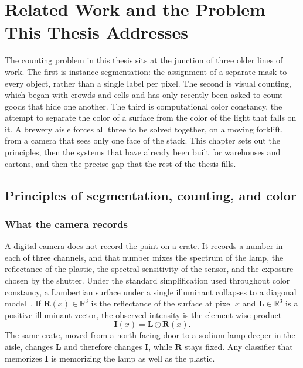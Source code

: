 \chapter{Related Work and the Problem This Thesis Addresses}
\label{ch:related}

The counting problem in this thesis sits at the junction of three older lines of work. The first is instance segmentation: the assignment of a separate mask to every object, rather than a single label per pixel. The second is visual counting, which began with crowds and cells and has only recently been asked to count goods that hide one another. The third is computational color constancy, the attempt to separate the color of a surface from the color of the light that falls on it. A brewery aisle forces all three to be solved together, on a moving forklift, from a camera that sees only one face of the stack. This chapter sets out the principles, then the systems that have already been built for warehouses and cartons, and then the precise gap that the rest of the thesis fills.

\section{Principles of segmentation, counting, and color}
\label{sec:principles}

\subsection{What the camera records}
\label{sec:formation}

A digital camera does not record the paint on a crate. It records a number in each of three channels, and that number mixes the spectrum of the lamp, the reflectance of the plastic, the spectral sensitivity of the sensor, and the exposure chosen by the shutter. Under the standard simplification used throughout color constancy, a Lambertian surface under a single illuminant collapses to a diagonal model~\cite{gijsenij2011survey}. If $\mathbf{R}(x)\in\mathbb{R}^{3}$ is the reflectance of the surface at pixel $x$ and $\mathbf{L}\in\mathbb{R}^{3}$ is a positive illuminant vector, the observed intensity is the element-wise product
\begin{equation}
\mathbf{I}(x) = \mathbf{L} \odot \mathbf{R}(x).
\label{eq:diagonal}
\end{equation}
The same crate, moved from a north-facing door to a sodium lamp deeper in the aisle, changes $\mathbf{L}$ and therefore changes $\mathbf{I}$, while $\mathbf{R}$ stays fixed. Any classifier that memorizes $\mathbf{I}$ is memorizing the lamp as well as the plastic.

